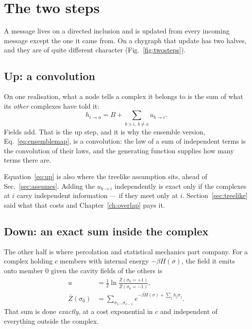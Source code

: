 \section{The two steps}
\label{sec:twosteps}

A message lives on a directed inclusion and is updated from every incoming
message except the one it came from. On a chygraph that update has two halves,
and they are of quite different character (Fig.~\ref{fig:twosteps}).

\subsection{Up: a convolution}
\label{sec:upstep}

On one realisation, what a node tells a complex it belongs to is the sum of
what its \emph{other} complexes have told it:
\begin{equation}
  h_{i\to a}=B+\sum_{b\ni i,\ b\ne a}u_{b\to i}.
  \label{eq:up}
\end{equation}
Fields add. That is the up step, and it is why the ensemble
version, Eq.~\eqref{eq:ensemblemap}, is a convolution: the law of a sum of
independent terms is the convolution of their laws, and the generating function
supplies how many terms there are.

Equation~\eqref{eq:up} is also where the treelike assumption sits, ahead of
Sec.~\ref{sec:assumes}. Adding the $u_{b\to
i}$ independently is exact only if the complexes at $i$ carry independent
information --- if they meet only at $i$. Section~\ref{sec:treelike} said what
that costs and Chapter~\ref{ch:overlap} pays it.

\subsection{Down: an exact sum inside the complex}
\label{sec:downstep}

The other half is where percolation and statistical mechanics part company. For
a complex holding $c$ members with internal energy $-\beta H(\sigma)$, the field
it emits onto member $0$ given the cavity fields of the others is
\begin{equation}
  \begin{split}
    u&=\tfrac12\ln\frac{\bar{Z}(\sigma_{0}=+1)}{\bar{Z}(\sigma_{0}=-1)},\\
    \bar{Z}(\sigma_{0})&=\!\!\sum_{\sigma_{1}\dots\sigma_{c-1}}\!\!
      e^{-\beta H(\sigma)+\sum_{j}h_{j}\sigma_{j}}.
  \end{split}
  \label{eq:emitted}
\end{equation}
That sum is done \emph{exactly}, at a cost exponential in $c$ and independent of
everything outside the complex.

